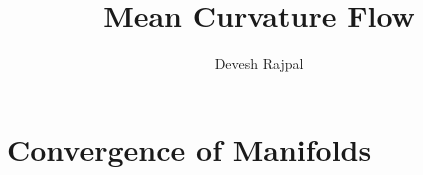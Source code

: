 \documentclass[11pt,twoside=semi]{scrbook}
\begin{document}
\title{Mean Curvature Flow}
\author{Devesh Rajpal}
\date{}
\publishers{Adviser: Prof. Ben Andrews}
\frontmatter
\maketitle
\setcounter{page}{4}
 


\mainmatter
\tableofcontents   




\appendix
\chapter{Convergence of Manifolds}
\backmatter
\nocite{*}
\end{document}
